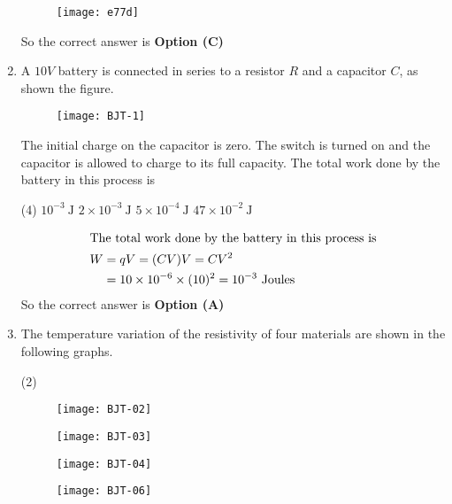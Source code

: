\begin{enumerate}
\begin{tasks}
\begin{figure}[H]
	\centering
	\texttt{[image: e77d]}
\end{figure}
\end{tasks}
\begin{answer}
So the correct answer is \textbf{Option (C)}
\end{answer}
\item A $10 V$ battery is connected in series to a resistor $R$ and a capacitor $C$, as shown the figure.\\\begin{figure}[H]
	\centering
	\texttt{[image: BJT-1]}
\end{figure}
The initial charge on the capacitor is zero. The switch is turned on and the capacitor is allowed to charge to its full capacity. The total work done by the battery in this process is
{}
\begin{tasks}(4)
\task[\textbf{A.}] $10^{-3} \mathrm{~J}$
\task[\textbf{B.}] $2 \times 10^{-3} \mathrm{~J}$
\task[\textbf{C.}] $5 \times 10^{-4} \mathrm{~J}$
\task[\textbf{D.}] $47 \times 10^{-2} \mathrm{~J}$
\end{tasks}
\begin{answer}
\begin{align*}
\intertext{The total work done by the battery in this process is}
W&=q V=(C V) V=C V^{2}\\&=10 \times 10^{-6} \times(10)^{2}=10^{-3}\text{ Joules}
\end{align*}
So the correct answer is \textbf{Option (A)}
\end{answer}
\item The temperature variation of the resistivity of four materials are shown in the following graphs.
\begin{tasks}(2)
	\task[\textbf{A.}] \begin{figure}[H]
		\centering
		\texttt{[image: BJT-02]}
	\end{figure}
	\task[\textbf{B.}]\begin{figure}[H]
		\centering
		\texttt{[image: BJT-03]}
	\end{figure}
	\task[\textbf{C.}] \begin{figure}[H]
		\centering
		\texttt{[image: BJT-04]}
	\end{figure}
	\task[\textbf{D.}] \begin{figure}[H]
		\centering
		\texttt{[image: BJT-06]}
	\end{figure}

\end{tasks}
\end{enumerate}
